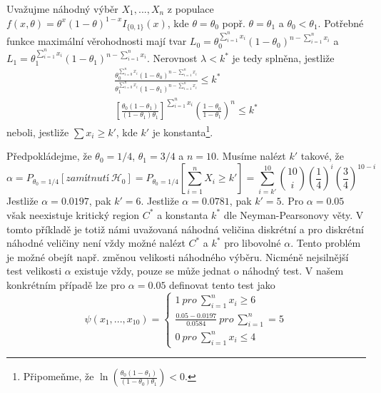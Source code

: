 \begin{example}
Uvažujme náhodný výběr $X_1, ..., X_n$ z populace $f(x, \theta) = \theta^x(1 - \theta)^{1 - x}I_{\{0, 1\}}(x)$, kde $\theta = \theta_0$ popř. $\theta = \theta_1$ a $\theta_0 < \theta_1$. Potřebné funkce maximální věrohodnosti mají tvar $L_0 = \theta_0^{\sum_{i = 1}^n x_i}(1 - \theta_0)^{n - \sum_{i = 1}^n x_i}$ a $L_1 = \theta_1^{\sum_{i = 1}^n x_i}(1 - \theta_1)^{n - \sum_{i = 1}^n x_i}$. Nerovnost $\lambda < k^*$ je tedy splněna, jestliže
\begin{gather*}
\frac{\theta_0^{\sum_{i = 0}^n x_i}(1 - \theta_0)^{n - \sum_{i = 1}^n x_i}}{\theta_1^{\sum_{i = 0}^n x_i}(1 - \theta_1)^{n - \sum_{i = 1}^n x_i}} \le k^*\\
\left[\frac{\theta_0(1 - \theta_1)}{(1 - \theta_1)\theta_1}\right]^{\sum_{i = 1}^n x_i} \left(\frac{1 - \theta_0}{1 - \theta_1}\right)^n \le k^*
\end{gather*}
neboli, jestliže $\sum x_i \ge k'$, kde $k'$ je konstanta\footnote{Připomeňme, že $\ln \left(\frac{\theta_0 (1 - \theta_1)}{(1 - \theta_0)\theta_1}\right) < 0$.}.

Předpokládejme, že $\theta_0 = 1/4$, $\theta_1 = 3/4$ a $n = 10$. Musíme nalézt $k'$ takové, že
\begin{equation*}
\alpha = P_{\theta_0 = 1/4}[\textit{zamítnutí} ~ \mathscr{H}_0] = P_{\theta_0 = 1/4}\left[\sum_{i = 1}^n X_i \ge k' \right] = \sum_{i = k'}^{10}\binom{10}{i}\left(\frac{1}{4}\right)^i\left(\frac{3}{4}\right)^{10 - i}
\end{equation*}
Jestliže $\alpha = 0.0197$, pak $k' = 6$. Jestliže $\alpha = 0.0781$, pak $k' = 5$. Pro $\alpha = 0.05$ však neexistuje kritický region $C^*$ a konstanta $k^*$ dle Neyman-Pearsonovy věty. V tomto příkladě je totiž námi uvažovaná náhodná veličina diskrétní a pro diskrétní náhodné veličiny není vždy možné nalézt $C^*$ a $k^*$ pro libovolné $\alpha$. Tento problém je možné obejít např. změnou velikosti náhodného výběru. Nicméně nejsilnější test velikosti $\alpha$ existuje vždy, pouze se může jednat o náhodný test. V našem konkrétním případě lze pro $\alpha = 0.05$ definovat tento test jako
\begin{equation*}
\psi(x_1, ..., x_{10}) =
\begin{cases}
1 ~ \textit{pro} ~ \sum_{i = 1}^n x_i \ge 6\\
\frac{0.05 - 0.0197}{0.0584} ~ \textit{pro} ~ \sum_{i = 1}^n = 5\\
0 ~ \textit{pro} ~ \sum_{i = 1}^n x_i \le 4
\end{cases}
\end{equation*}
\end{example}

